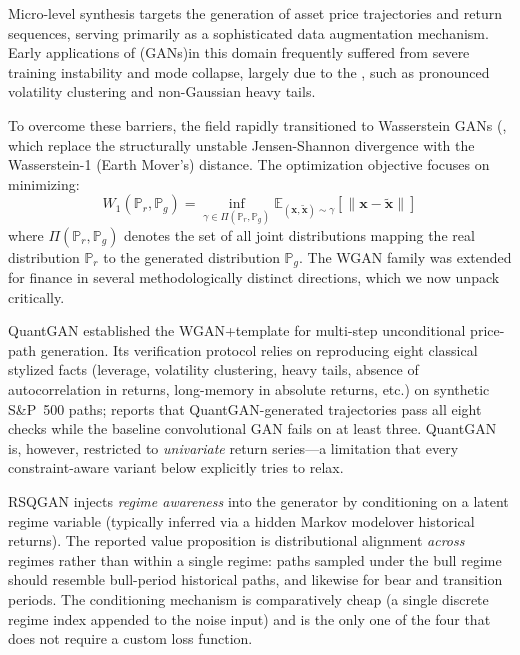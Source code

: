 Micro-level synthesis targets the generation of asset price trajectories and return sequences, serving primarily as a sophisticated data augmentation mechanism. Early applications of (GANs)in this domain frequently suffered from severe training instability and mode collapse, largely due to the , such as pronounced volatility clustering and non-Gaussian heavy tails.

To overcome these barriers, the field rapidly transitioned to Wasserstein GANs (, which replace the structurally unstable Jensen-Shannon divergence with the Wasserstein-1 (Earth Mover's) distance. The optimization objective focuses on minimizing:
\begin{equation}
W_1(\mathbb{P}_r, \mathbb{P}_g) = \inf_{\gamma \in \Pi(\mathbb{P}_r, \mathbb{P}_g)} \mathbb{E}_{(\mathbf{x}, \tilde{\mathbf{x}}) \sim \gamma}[\|\mathbf{x} - \tilde{\mathbf{x}}\|]
\end{equation}
where $\Pi(\mathbb{P}_r, \mathbb{P}_g)$ denotes the set of all joint distributions mapping the real distribution $\mathbb{P}_r$ to the generated distribution $\mathbb{P}_g$. The WGAN family was extended for finance in several methodologically distinct directions, which we now unpack critically.

QuantGAN \citep{wiese2020} established the WGAN+template for multi-step unconditional price-path generation. Its verification protocol relies on reproducing eight classical stylized facts (leverage, volatility clustering, heavy tails, absence of autocorrelation in returns, long-memory in absolute returns, etc.) on synthetic S\&P~500 paths; reports that QuantGAN-generated trajectories pass all eight checks while the baseline convolutional GAN fails on at least three. QuantGAN is, however, restricted to \emph{univariate} return series---a limitation that every constraint-aware variant below explicitly tries to relax.

RSQGAN \citep{RSQGAN} injects \emph{regime awareness} into the generator by conditioning on a latent regime variable (typically inferred via a hidden Markov modelover historical returns). The reported value proposition is distributional alignment \emph{across} regimes rather than within a single regime: paths sampled under the bull regime should resemble bull-period historical paths, and likewise for bear and transition periods. The conditioning mechanism is comparatively cheap (a single discrete regime index appended to the noise input) and is the only one of the four that does not require a custom loss function.

